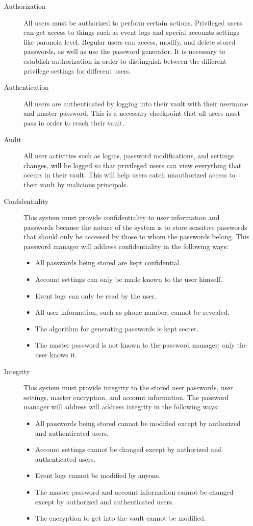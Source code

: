 \documentclass{article}
\begin{document}
\begin{description}
  \item[Authorization] All users must be authorized to perform certain actions. Privileged users can get access to things such as event logs and special accounts settings like paranoia level. Regular users can access, modify, and delete stored passwords, as well as use the password generator. It is necessary to establish authorization in order to distinguish between the different privilege settings for different users.
  \item[Authentication] All users are authenticated by logging into their vault with their username and master password. This is a necessary checkpoint that all users must pass in order to reach their vault.
  \item[Audit] All user activities such as logins, password modifications, and settings changes, will be logged so that privileged users can view everything that occurs in their vault. This will help users catch unauthorized access to their vault by malicious principals.
  \item[Confidentiality] This system must provide confidentiality to user information and passwords because the nature of the system is to store sensitive passwords that should only be accessed by those to whom the passwords belong. This password manager will address confidentiality in the following ways: \begin{itemize}
    \item All passwords being stored are kept confidential.
    \item Account settings can only be made known to the user himself.
    \item Event logs can only be read by the user.
    \item All user information, such as phone number, cannot be revealed.
    \item The algorithm for generating passwords is kept secret.
    \item The master password is not known to the password manager; only the user knows it.
  \end{itemize}
  \item[Integrity] This system must provide integrity to the stored user passwords, user settings, master encryption, and account information. The password manager will address will address integrity in the following ways:
    \begin{itemize}
      \item All passwords being stored cannot be modified except by authorized and authenticated users.
      \item Account settings cannot be changed except by authorized and authenticated users.
      \item Event logs cannot be modified by anyone.
      \item The master password and account information cannot be changed except by authorized and authenticated users.
      \item The encryption to get into the vault cannot be modified.
    \end{itemize}
\end{description}
\end{document}
